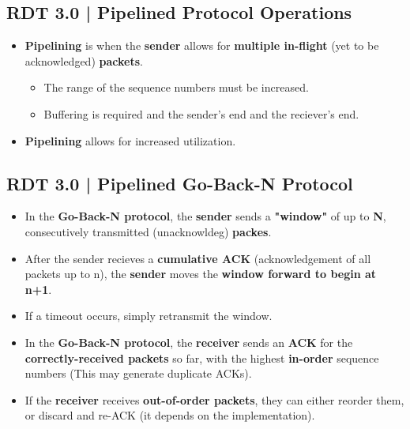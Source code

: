 \documentclass[16pt]{article}
\begin{document}
    \subsection*{RDT 3.0 | Pipelined Protocol Operations}
    \begin{itemize}
        \item \textbf{Pipelining} is when the \textbf{sender} allows for \textbf{multiple in-flight} (yet to be acknowledged) \textbf{packets}.
        \begin{itemize}
            \item The range of the sequence numbers must be increased.
            \item Buffering is required and the sender's end and the reciever's end.
        \end{itemize}
        \item \textbf{Pipelining} allows for increased utilization.
    \end{itemize}

    \subsection*{RDT 3.0 | Pipelined Go-Back-N Protocol}
    \begin{itemize}
        \item In the \textbf{Go-Back-N protocol}, the \textbf{sender} sends a \textbf{"window"} of up to \textbf{N}, consecutively transmitted (unacknowldeg) \textbf{packes}.
        \item After the sender recieves a \textbf{cumulative ACK} (acknowledgement of all packets up to n), the \textbf{sender} moves the \textbf{window forward to begin at n+1}.
        \item If a timeout occurs, simply retransmit the window.
        \item In the \textbf{Go-Back-N protocol}, the \textbf{receiver} sends an \textbf{ACK} for the \textbf{correctly-received packets} so far, with the highest \textbf{in-order} sequence numbers (This may generate duplicate ACKs).
        \item If the \textbf{receiver} receives \textbf{out-of-order packets}, they can either reorder them, or discard and re-ACK (it depends on the implementation).
    \end{itemize}
\end{document}
